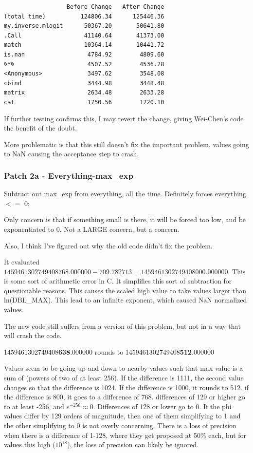 \begin{verbatim}
                  Before Change   After Change
(total time)          124806.34      125446.36
my.inverse.mlogit      50367.20       50641.80
.Call                  41140.64       41373.00
match                  10364.14       10441.72
is.nan                  4784.92        4809.60
%*%                     4507.52        4536.28
<Anonymous>             3497.62        3548.08
cbind                   3444.98        3448.48
matrix                  2634.48        2633.28
cat                     1750.56        1720.10
\end{verbatim}

If further testing confirms this, I may revert the change, giving Wei-Chen's code the benefit of the doubt.

More problematic is that this still doesn't fix the important problem, values going to NaN causing the acceptance step to crash.


\subsubsection{Patch 2a - Everything-max\_exp}

Subtract out max\_exp from everything, all the time.
Definitely forces everything $<=$ 0;

Only concern is that if something small is there, it will be forced too low, and be exponentiated to 0. Not a LARGE concern, but a concern.

Also, I think I've figured out why the old code didn't fix the problem.

It evaluated $1459461302749408768.000000 - 709.782713 = 1459461302749408000.000000$. This is some sort of arithmetic error in C. It simplifies this sort of subtraction for questionable reasons. This causes the scaled high value to take values larger than ln(DBL\_MAX). This lead to an infinite exponent, which caused NaN normalized values.

The new code still suffers from a version of this problem, but not in a way that will crash the code. 

1459461302749408\textbf{638}.000000 rounds to
1459461302749408\textbf{512}.000000

Values seem to be going up and down to nearby values such that max-value is a sum of (powers of two of at least 256). If the difference is 1111, the second value changes so that the difference is 1024. If the difference is 1000, it rounds to 512. if the difference is 800, it goes to a difference of 768. differences of 129 or higher go to at least -256, and $e^{-256} \approx 0$. Differences of 128 or lower go to 0.  If the phi values differ by 129 orders of magnitude, then one of them simplifying to 1 and the other simplifying to 0 is not overly concerning. There is a loss of precision when there is a difference of 1-128, where they get proposed at 50\% each, but for values this high ($10^{18}$), the loss of precision can likely be ignored.



